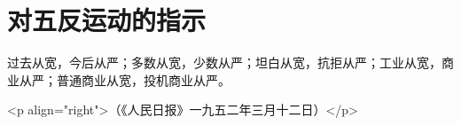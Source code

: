 \section[对五反运动的指示（一九五二年三月）]{对五反运动的指示}


过去从宽，今后从严；多数从宽，少数从严；坦白从宽，抗拒从严；工业从宽，商业从严；普通商业从宽，投机商业从严。

<p align="right">（《人民日报》一九五二年三月十二日）</p>


